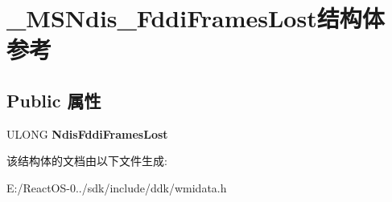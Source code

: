 \hypertarget{struct___m_s_ndis___fddi_frames_lost}{}\section{\+\_\+\+M\+S\+Ndis\+\_\+\+Fddi\+Frames\+Lost结构体 参考}
\label{struct___m_s_ndis___fddi_frames_lost}
\subsection*{Public 属性}
\begin{DoxyCompactItemize}
\item 
\mbox{\label{struct___m_s_ndis___fddi_frames_lost_a1d04f84e7a1a244cd76b89d18c3e88f3}} 
U\+L\+O\+NG {\bfseries Ndis\+Fddi\+Frames\+Lost}
\end{DoxyCompactItemize}


该结构体的文档由以下文件生成\+:\begin{DoxyCompactItemize}
\item 
E\+:/\+React\+O\+S-\/0../sdk/include/ddk/wmidata.\+h\end{DoxyCompactItemize}
